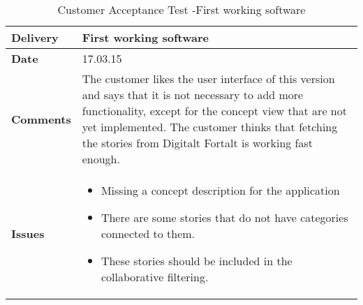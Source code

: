 \renewcommand{\arraystretch}{2}%
\begin{center}
	\begin{longtable}{ | p{4cm} | p{13cm} | }
		
		\caption[Customer Acceptance test]{Customer Acceptance Test -First working software } \label{Tab:cattest3}\\
		\hline
		\textbf{Delivery} & First working software\\ \hline
		\textbf{Date} & 17.03.15 \\ \hline
		\textbf{Comments} & The customer likes the user interface of this version and says that it is not necessary to add more functionality, except for the concept view that are not yet implemented. The customer thinks that fetching the stories from Digitalt Fortalt is working fast enough.  \\ \hline			
		\textbf{Issues} & 
		\begin{itemize}[noitemsep]
			
			\item Missing a concept description for the application 
			\item There are some stories that do not have categories connected to them. 
			\item These stories should be included in the collaborative filtering.
		\end{itemize}
		\\ \hline		
	\end{longtable}
\end{center}

